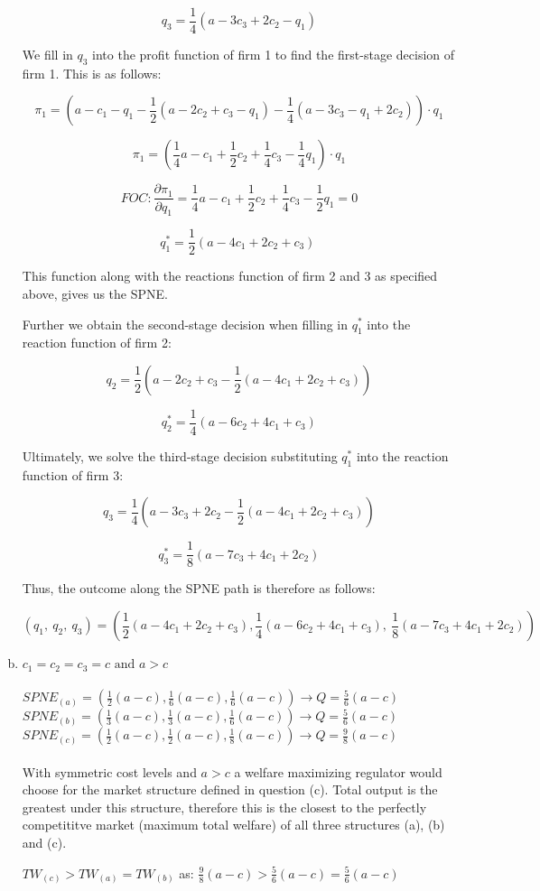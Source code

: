 \documentclass[a4paper]{article}
\begin{document}
\begin{enumerate}[(a)]
\[q_{3} = \frac{1}{4}(a - 3c_{3} + 2c_{2} - q_{1})\]

We fill in \(q_{3}\) into the profit function of firm 1 to find the
first-stage decision of firm 1. This is as follows:

\[\pi_{1} = \left( a - c_{1} - q_{1} - \frac{1}{2}\left( a - 2c_{2} + c_{3} - q_{1} \right) - \frac{1}{4}(a - 3c_{3} - q_{1} + 2c_{2}) \right) \cdot q_{1}\]

\[\pi_{1} = \left( \frac{1}{4}a - c_{1} + \frac{1}{2}c_{2} + \frac{1}{4}c_{3} - \frac{1}{4}q_{1} \right) \cdot q_{1}\]

\[FOC: \frac{\partial \pi_1}{\partial q_1}= \frac{1}{4}a - c_{1} + \frac{1}{2}c_{2} + \frac{1}{4}c_{3} - \frac{1}{2}q_{1} = 0\]

\[q_{1}^{*} = \frac{1}{2}(a - 4c_{1} + 2c_{2} + c_{3})\ \]

This function along with the reactions function of firm 2 and 3 as
specified above, gives us the SPNE.

Further we obtain the second-stage decision when filling in
\(q_{1}^{*}\) into the reaction function of firm 2:

\[q_{2} = \frac{1}{2}\left( a - 2c_{2} + c_{3} - \frac{1}{2}\left( a - 4c_{1} + 2c_{2} + c_{3} \right) \right)\]

\[q_{2}^{*} = \frac{1}{4}\left( a - 6c_{2} + 4c_{1} + c_{3} \right)\]

Ultimately, we solve the third-stage decision substituting \(q_{1}^{*}\)
into the reaction function of firm 3:

\[q_{3} = \frac{1}{4}\left( a - 3c_{3} + 2c_{2} - \frac{1}{2}\left( a - 4c_{1} + 2c_{2} + c_{3} \right) \right)\]

\[q_{3}^{*} = \frac{1}{8}(a - 7c_{3} + 4c_{1} + 2c_{2})\]

Thus, the outcome along the SPNE path is therefore as follows:

\[\left( q_{1},\ q_{2},\ q_{3} \right) = \left( \frac{1}{2}\left( a - 4c_{1} + 2c_{2} + c_{3} \right),\frac{1}{4}\left( a - 6c_{2} + 4c_{1} + c_{3} \right),\ \frac{1}{8}\left( a - 7c_{3} + 4c_{1} + 2c_{2} \right) \right)\]

\item
$c_1=c_2=c_3=c \text{ and } a>c$\\
\\
$SPNE_{(a)}=(\frac{1}{2}(a-c),\frac{1}{6}(a-c),\frac{1}{6}(a-c))\rightarrow Q=\frac{5}{6}(a-c)$\\
$SPNE_{(b)}=(\frac{1}{3}(a-c),\frac{1}{3}(a-c),\frac{1}{6}(a-c))\rightarrow Q=\frac{5}{6}(a-c)$\\
$SPNE_{(c)}=(\frac{1}{2}(a-c),\frac{1}{2}(a-c),\frac{1}{8}(a-c))\rightarrow Q=\frac{9}{8}(a-c)$\\
\\
With symmetric cost levels and $a>c$ a welfare maximizing regulator would choose for the market structure defined in question (c). Total output is the greatest under this structure, therefore this is the closest to the perfectly competititve market (maximum total welfare) of all three structures (a), (b) and (c). 

$TW_{(c)}>TW_{(a)}=TW_{(b)}$ as: $\frac{9}{8}(a-c)>\frac{5}{6}(a-c)=\frac{5}{6}(a-c)$
\end{enumerate}
\end{document}

